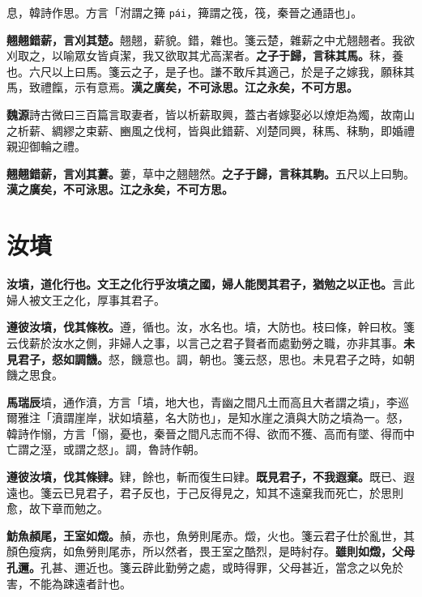 \begin{quoting}息，韓詩作思。方言「泭謂之篺 \texttt{pái}，篺謂之筏，筏，秦晉之通語也」。\end{quoting}

\textbf{翹翹錯薪，言刈其楚。}{\footnotesize 翹翹，薪貌。錯，雜也。箋云楚，雜薪之中尤翹翹者。我欲刈取之，以喻眾女皆貞潔，我又欲取其尤高潔者。}\textbf{之子于歸，言秣其馬。}{\footnotesize 秣，養也。六尺以上曰馬。箋云之子，是子也。謙不敢斥其適己，於是子之嫁我，願秣其馬，致禮餼，示有意焉。}\textbf{漢之廣矣，不可泳思。江之永矣，不可方思。}

\begin{quoting}\textbf{魏源}詩古微曰三百篇言取妻者，皆以析薪取興，蓋古者嫁娶必以燎炬為燭，故南山之析薪、綢繆之束薪、豳風之伐柯，皆與此錯薪、刈楚同興，秣馬、秣駒，即婚禮親迎御輪之禮。\end{quoting}

\textbf{翹翹錯薪，言刈其蔞。}{\footnotesize 蔞，草中之翹翹然。}\textbf{之子于歸，言秣其駒。}{\footnotesize 五尺以上曰駒。}\textbf{漢之廣矣，不可泳思。江之永矣，不可方思。}

\section{汝墳}


\textbf{汝墳，道化行也。文王之化行乎汝墳之國，婦人能閔其君子，猶勉之以正也。}{\footnotesize 言此婦人被文王之化，厚事其君子。}

\textbf{遵彼汝墳，伐其條枚。}{\footnotesize 遵，循也。汝，水名也。墳，大防也。枝曰條，幹曰枚。箋云伐薪於汝水之側，非婦人之事，以言己之君子賢者而處勤勞之職，亦非其事。}\textbf{未見君子，惄如調饑。}{\footnotesize 惄，饑意也。調，朝也。箋云惄，思也。未見君子之時，如朝饑之思食。}

\begin{quoting}\textbf{馬瑞辰}墳，通作濆，方言「墳，地大也，青幽之間凡土而高且大者謂之墳」，李巡爾雅注「濆謂崖岸，狀如墳墓，名大防也」，是知水崖之濆與大防之墳為一。惄，韓詩作愵，方言「愵，憂也，秦晉之間凡志而不得、欲而不獲、高而有墜、得而中亡謂之溼，或謂之惄」。調，魯詩作朝。\end{quoting}

\textbf{遵彼汝墳，伐其條肄。}{\footnotesize 肄，餘也，斬而復生曰肄。}\textbf{既見君子，不我遐棄。}{\footnotesize 既已、遐遠也。箋云已見君子，君子反也，于己反得見之，知其不遠棄我而死亡，於思則愈，故下章而勉之。}

\textbf{魴魚頳尾，王室如燬。}{\footnotesize 赬，赤也，魚勞則尾赤。燬，火也。箋云君子仕於亂世，其顏色瘦病，如魚勞則尾赤，所以然者，畏王室之酷烈，是時紂存。}\textbf{雖則如燬，父母孔邇。}{\footnotesize 孔甚、邇近也。箋云辟此勤勞之處，或時得罪，父母甚近，當念之以免於害，不能為踈遠者計也。}

